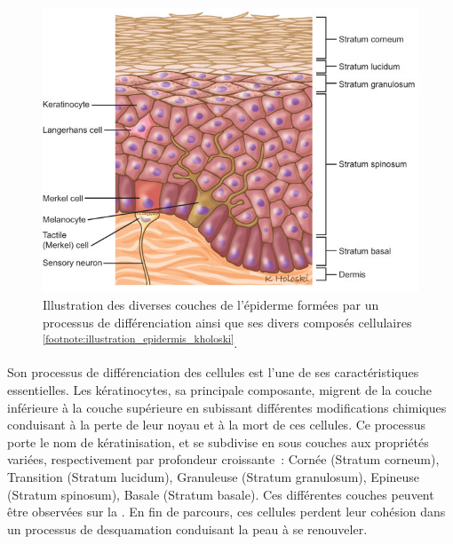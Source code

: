  \begin{figure}[H]
    \centering
    \includegraphics[width=0.7\linewidth]{contents/chapter_1/resources/illustration_epidermis_kholoski.png}
    \caption{Illustration des diverses couches de l'épiderme formées par un processus de différenciation ainsi que ses divers composés cellulaires \textsuperscript{\ref{footnote:illustration_epidermis_kholoski}}.}
    \label{fig:illustration_epidermis_kholoski}
\end{figure}\par

\addtocounter{footnote}{1}

Son processus de différenciation des cellules est l’une de ses caractéristiques essentielles. Les kératinocytes, sa principale composante, migrent de la couche inférieure à la couche supérieure en subissant différentes modifications chimiques conduisant à la perte de leur noyau et à la mort de ces cellules. Ce processus porte le nom de kératinisation, et se subdivise en sous couches aux propriétés variées, respectivement par profondeur croissante~: Cornée (Stratum corneum), Transition (Stratum lucidum), Granuleuse (Stratum granulosum), Epineuse (Stratum spinosum), Basale (Stratum basale). Ces différentes couches peuvent être observées sur la . En fin de parcours, ces cellules perdent leur cohésion dans un processus de desquamation conduisant la peau à se renouveler.\par
\clearpage

